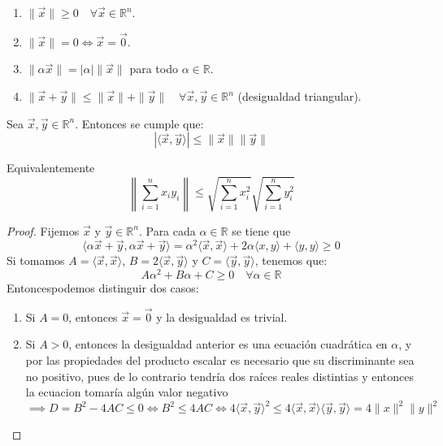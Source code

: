 \begin{proposición}
    \begin{enumerate}
        \item $\|\vec{x}\| \geq 0 \quad \forall \vec{x} \in \mathbb{R}^n$.
        \item $\|\vec{x}\| = 0 \Leftrightarrow \vec{x} = \vec{0}$.
        \item $\|\alpha \vec{x}\| = |\alpha| \|\vec{x}\|$ para todo $\alpha \in \mathbb{R}$.
        \item $\|\vec{x} + \vec{y}\| \leq \|\vec{x}\| + \|\vec{y}\| \quad \forall \vec{x}, \vec{y} \in \mathbb{R}^n$ (desigualdad triangular).
    \end{enumerate}
\end{proposición}

\begin{teorema}
    Sea \( \vec{x}, \vec{y} \in \mathbb{R}^n \). Entonces se cumple que:
    \[
        |\langle \vec{x}, \vec{y} \rangle| \leq \|\vec{x}\| \|\vec{y}\|
    \]

    Equivalentemente 
    $$\left\|\sum_{i=1}^{n} x_i y_i\right\| \leq \sqrt{\sum_{i=1}^{n} x_i^2} \sqrt{\sum_{i=1}^{n} y_i^2}$$
    
\end{teorema}

\begin{proof}
    Fijemos $\vec{x}$ y $\vec{y} \in \mathbb{R}^n$. Para cada $\alpha \in \mathbb{R}$ se tiene que 
    $$\langle \alpha \vec{x} + \vec{y}, \alpha \vec{x} + \vec{y} \rangle  = \alpha^2 \langle \vec{x}, \vec{x} \rangle + 2\alpha \langle x, y\rangle + \langle y, y \rangle \geq 0$$
    Si tomamos $A = \langle \vec{x}, \vec{x} \rangle$, $B = 2\langle \vec{x}, \vec{y} \rangle$ y $C = \langle \vec{y}, \vec{y} \rangle$, tenemos que: 
    $$A\alpha^2 + B\alpha + C \geq 0 \quad \forall \alpha \in \mathbb{R}$$
    Entoncespodemos distinguir dos casos:
    \begin{enumerate}
        \item Si \( A = 0 \), entonces \( \vec{x} = \vec{0} \) y la desigualdad es trivial.
        \item Si \( A > 0 \), entonces la desigualdad anterior es una ecuación cuadrática en \( \alpha \), y por las propiedades del producto escalar es necesario que su discriminante sea no positivo, pues de lo contrario tendría dos raíces reales distintias y entonces la ecuacion tomaría algún valor negativo 
        $$\implies D = B^2 - 4AC \leq 0 \iff B^2 \leq 4AC \iff 4\langle \vec{x}, \vec{y} \rangle^2 \leq 4\langle \vec{x}, \vec{x} \rangle \langle \vec{y}, \vec{y} \rangle = 4\|x\|^2 \|y\|^2$$
    \end{enumerate}

\end{proof}

